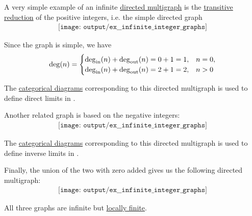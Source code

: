 \begin{example}\label{ex:infinite_integer_graphs}
  A very simple example of an infinite \hyperref[def:directed_multigraph]{directed multigraph} is the \hyperref[def:transitive_reduction]{transitive reduction} of the positive integers, i.e. the simple directed graph
  \begin{equation}\label{eq:ex:infinite_integer_graphs/positive}
    \begin{aligned}
      \texttt{[image: output/ex\_\_infinite\_integer\_graphs]}
    \end{aligned}
  \end{equation}

  Since the graph is simple, we have
  \begin{equation*}
    \deg(n) = \begin{cases}
      \deg_{\operatorname{in}}(n) + \deg_{\operatorname{out}}(n) = 0 + 1 = 1, &n = 0, \\
      \deg_{\operatorname{in}}(n) + \deg_{\operatorname{out}}(n) = 2 + 1 = 2, &n > 0 \\
    \end{cases}
  \end{equation*}

  The \hyperref[def:categorical_diagram]{categorical diagrams} corresponding to this directed multigraph is used to define direct limits in .

  Another related graph is based on the negative integers:
  \begin{equation}\label{eq:ex:infinite_integer_graphs/negative}
    \begin{aligned}
      \texttt{[image: output/ex\_\_infinite\_integer\_graphs]}
    \end{aligned}
  \end{equation}

  The \hyperref[def:categorical_diagram]{categorical diagrams} corresponding to this directed multigraph is used to define inverse limits in .

  Finally, the union of the two with zero added gives us the following directed multigraph:
  \begin{equation}\label{eq:ex:infinite_integer_graphs/two_sided}
    \begin{aligned}
      \texttt{[image: output/ex\_\_infinite\_integer\_graphs]}
    \end{aligned}
  \end{equation}

  All three graphs are infinite but \hyperref[def:graph_cardinality/local]{locally finite}.
\end{example}

